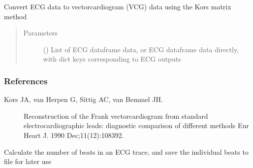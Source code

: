 \documentclass[letterpaper,10pt,english]{sphinxmanual}
\begin{document}
\begin{fulllineitems}
\begin{fulllineitems}
\label{\detokenize{_autosummary/signalanalysis.vcg.Vcg:signalanalysis.vcg.Vcg.get_from_ecg}}
\sphinxAtStartPar
Convert ECG data to vectorcardiogram (VCG) data using the Kors matrix method
\begin{quote}\begin{description}
\item[{Parameters}] \leavevmode
\sphinxAtStartPar
{} ({\hyperref[\detokenize{_autosummary/signalanalysis.ecg.Ecg:signalanalysis.ecg.Ecg}]{}}) \textendash{} List of ECG dataframe data, or ECG dataframe data directly, with dict keys corresponding to ECG outputs

\end{description}\end{quote}
\subsubsection*{References}
\begin{description}
\item[{Kors JA, van Herpen G, Sittig AC, van Bemmel JH.}] \leavevmode
\sphinxAtStartPar
Reconstruction of the Frank vectorcardiogram from standard electrocardiographic leads: diagnostic comparison
of different methods
Eur Heart J. 1990 Dec;11(12):1083\sphinxhyphen{}92.

\end{description}

\end{fulllineitems}


\begin{fulllineitems}
\label{\detokenize{_autosummary/signalanalysis.vcg.Vcg:signalanalysis.vcg.Vcg.get_n_beats}}
\sphinxAtStartPar
Calculate the number of beats in an ECG trace, and save the individual beats to file for later use
\begin{quote}


\end{quote}
\end{fulllineitems}
\end{fulllineitems}
\end{document}
